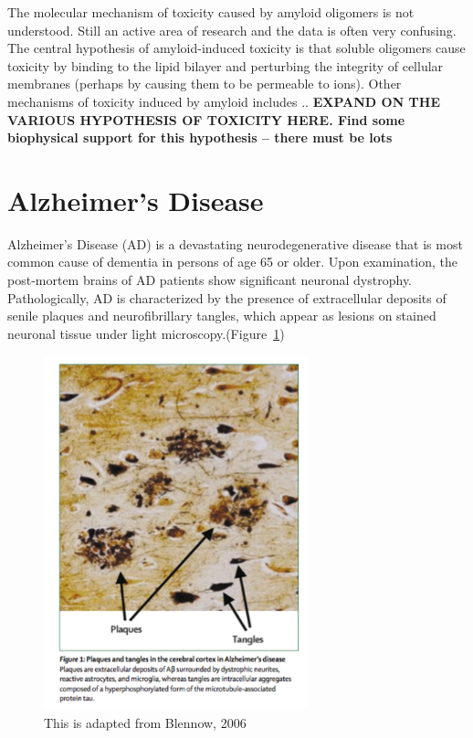 The molecular mechanism of toxicity caused by amyloid oligomers is not understood. %
Still an active area of research and the data is often very confusing. The central hypothesis of amyloid-induced toxicity is that soluble oligomers cause toxicity by binding to the lipid bilayer and perturbing the integrity of cellular membranes (perhaps by causing them to be permeable to ions).\cite{Martins:2008bz,Walsh:2007fu} Other mechanisms of toxicity induced by amyloid includes .. %
\textbf{EXPAND ON THE VARIOUS HYPOTHESIS OF TOXICITY HERE. Find some biophysical support for this hypothesis -- there must be lots}

\section{Alzheimer's Disease}

Alzheimer's Disease (AD) is a devastating neurodegenerative disease that is most common cause of dementia in persons of age 65 or older.  Upon examination, the post-mortem brains of AD patients show significant neuronal dystrophy.  Pathologically, AD is characterized by the presence of extracellular deposits of senile plaques and neurofibrillary tangles, which appear as lesions on stained neuronal tissue under light microscopy.(Figure~\ref{fig:AD_tissue_pathology})

\begin{figure}
  \centering
  \includegraphics[width=3in]{figures/introduction/AD_tissue_pathology.pdf}
  \caption[Image of lesions formed by plaques and NFTs on brain tissue]{This is adapted from Blennow, 2006}
  \label{fig:AD_tissue_pathology}
\end{figure}

